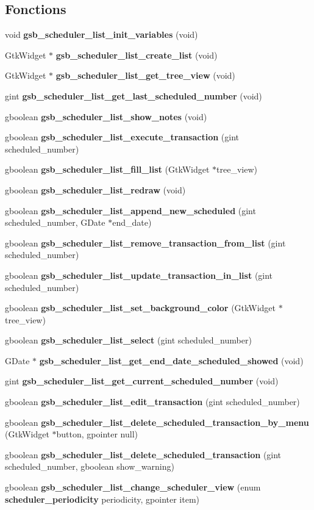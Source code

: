 \subsection*{Fonctions}
\begin{DoxyCompactItemize}
\item 
void {\bf gsb\_\-scheduler\_\-list\_\-init\_\-variables} (void)
\item 
GtkWidget $\ast$ {\bf gsb\_\-scheduler\_\-list\_\-create\_\-list} (void)
\item 
GtkWidget $\ast$ {\bf gsb\_\-scheduler\_\-list\_\-get\_\-tree\_\-view} (void)
\item 
gint {\bf gsb\_\-scheduler\_\-list\_\-get\_\-last\_\-scheduled\_\-number} (void)
\item 
gboolean {\bf gsb\_\-scheduler\_\-list\_\-show\_\-notes} (void)
\item 
gboolean {\bf gsb\_\-scheduler\_\-list\_\-execute\_\-transaction} (gint scheduled\_\-number)
\item 
gboolean {\bf gsb\_\-scheduler\_\-list\_\-fill\_\-list} (GtkWidget $\ast$tree\_\-view)
\item 
gboolean {\bf gsb\_\-scheduler\_\-list\_\-redraw} (void)
\item 
gboolean {\bf gsb\_\-scheduler\_\-list\_\-append\_\-new\_\-scheduled} (gint scheduled\_\-number, GDate $\ast$end\_\-date)
\item 
gboolean {\bf gsb\_\-scheduler\_\-list\_\-remove\_\-transaction\_\-from\_\-list} (gint scheduled\_\-number)
\item 
gboolean {\bf gsb\_\-scheduler\_\-list\_\-update\_\-transaction\_\-in\_\-list} (gint scheduled\_\-number)
\item 
gboolean {\bf gsb\_\-scheduler\_\-list\_\-set\_\-background\_\-color} (GtkWidget $\ast$tree\_\-view)
\item 
gboolean {\bf gsb\_\-scheduler\_\-list\_\-select} (gint scheduled\_\-number)
\item 
GDate $\ast$ {\bf gsb\_\-scheduler\_\-list\_\-get\_\-end\_\-date\_\-scheduled\_\-showed} (void)
\item 
gint {\bf gsb\_\-scheduler\_\-list\_\-get\_\-current\_\-scheduled\_\-number} (void)
\item 
gboolean {\bf gsb\_\-scheduler\_\-list\_\-edit\_\-transaction} (gint scheduled\_\-number)
\item 
gboolean {\bf gsb\_\-scheduler\_\-list\_\-delete\_\-scheduled\_\-transaction\_\-by\_\-menu} (GtkWidget $\ast$button, gpointer null)
\item 
gboolean {\bf gsb\_\-scheduler\_\-list\_\-delete\_\-scheduled\_\-transaction} (gint scheduled\_\-number, gboolean show\_\-warning)
\item 
gboolean {\bf gsb\_\-scheduler\_\-list\_\-change\_\-scheduler\_\-view} (enum {\bf scheduler\_\-periodicity} periodicity, gpointer item)
\end{DoxyCompactItemize}
